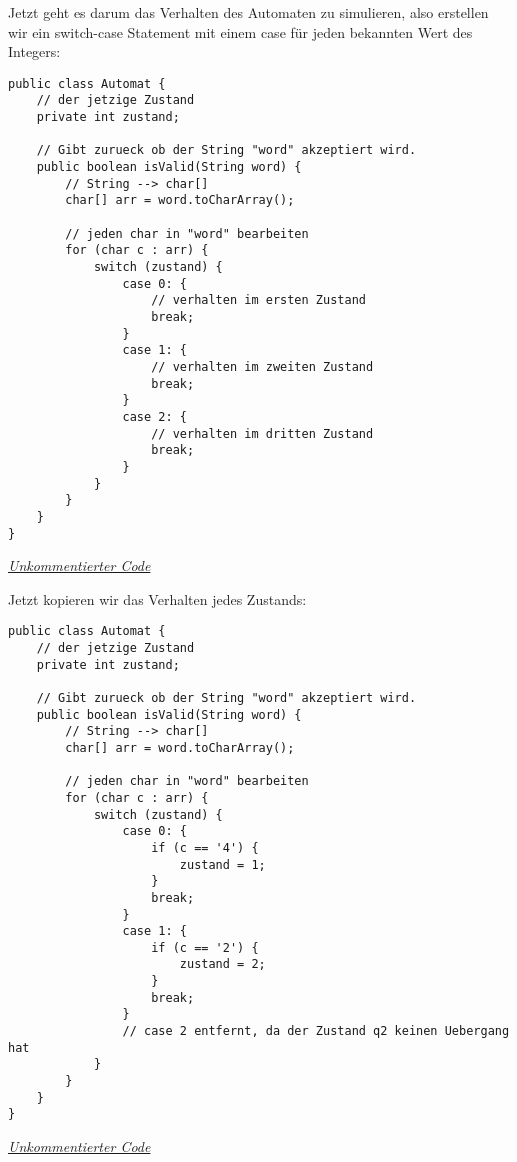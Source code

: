 \begin{flushleft}
    Jetzt geht es darum das Verhalten des Automaten zu simulieren, also erstellen wir ein switch-case Statement mit einem case für
    jeden bekannten Wert des Integers:
\end{flushleft}

\begin{center}
\begin{lstlisting}
public class Automat {
    // der jetzige Zustand
    private int zustand;

    // Gibt zurueck ob der String "word" akzeptiert wird.
    public boolean isValid(String word) {
        // String --> char[]
        char[] arr = word.toCharArray();

        // jeden char in "word" bearbeiten
        for (char c : arr) {
            switch (zustand) {
                case 0: {
                    // verhalten im ersten Zustand
                    break;
                }
                case 1: {
                    // verhalten im zweiten Zustand
                    break;
                }
                case 2: {
                    // verhalten im dritten Zustand
                    break;
                }
            }
        }
    }
}
\end{lstlisting}
\href{https://raw.githubusercontent.com/tim-tm/articles/refs/heads/main/informatik-notes/code/Automat.java}{\textit{Unkommentierter Code}} \\
\end{center}

\begin{flushleft}
    Jetzt kopieren wir das Verhalten jedes Zustands:
\end{flushleft}

\begin{center}
\begin{lstlisting}
public class Automat {
    // der jetzige Zustand
    private int zustand;

    // Gibt zurueck ob der String "word" akzeptiert wird.
    public boolean isValid(String word) {
        // String --> char[]
        char[] arr = word.toCharArray();

        // jeden char in "word" bearbeiten
        for (char c : arr) {
            switch (zustand) {
                case 0: {
                    if (c == '4') {
                        zustand = 1;
                    }
                    break;
                }
                case 1: {
                    if (c == '2') {
                        zustand = 2;
                    }
                    break;
                }
                // case 2 entfernt, da der Zustand q2 keinen Uebergang hat
            }
        }
    }
}
\end{lstlisting}
\href{https://raw.githubusercontent.com/tim-tm/articles/refs/heads/main/informatik-notes/code/Automat.java}{\textit{Unkommentierter Code}} \\
\end{center}

